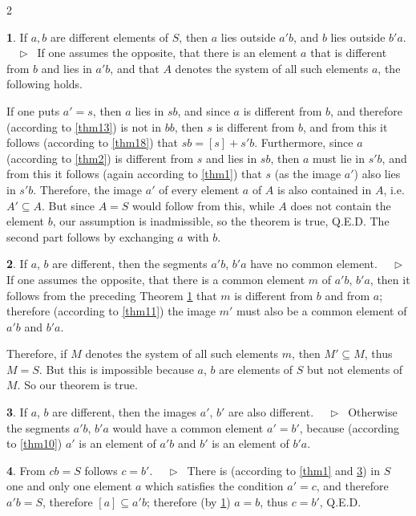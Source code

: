 \documentclass[leqno,hidelinks,10pt]{article}
\theoremstyle{definition}
\newtheorem{satz}{\protect\satzname}
\newcommand{\satzname}{}
\renewcommand{\satzname}{\hspace{-4pt}.\ Satz}%
\renewcommand{\satzname}{\hspace{-4pt}.\ Theorem}%
\newcommand\Beweis{\medskip \newline $ \phantom{'.'} \rhd \ $}%
\newcommand{\QED}{Q.E.D.}
\newcommand{\partof}{\subseteq}
\newcommand{\sref}[1]{\underline{\ref{#1}}}%
\begin{document}
\begin{paracol}{2}
\begin{rightcolumn}
\newpage

\begin{satz}\label{thm19}
If $a, b$ are different elements of $S$, then $a$ lies outside $a'b$, and $b$ lies
outside $b'a$.
\Beweis
If one assumes the opposite, that there is an element $a$ that is different from
$b$ and lies in $a'b$, and that $A$ denotes the system of all such elements $a$,
the following holds.

If one puts $a'=s$, then $a$ lies in $sb$, and since $a$ is different from $b$,
and therefore (according to \sref{thm13}) is not in $bb$, then $s$ is different
from $b$, and from this it follows (according to \sref{thm18}) that $sb = [s] + s'b$.
Furthermore, since $a$ (according to \sref{thm2}) is different from $s$ and lies
in $sb$, then $a$ must lie in $s'b$, and from this it follows (again according to
\sref{thm1}) that $s$ (as the image $a'$) also lies in $s'b$. %
Therefore, the image $a'$ of every element $a$ of $A$ is also contained in $A$,
i.e. $A' \partof A$. But since $A=S$ would follow from this, while $A$ does not
contain the element $b$, our assumption is inadmissible, so the theorem is true,
\QED
The second part follows by exchanging $a$ with $b$.%
\end{satz}

\begin{satz}\label{thm20}
If $a$, $b$ are different, then the segments $a'b$, $b'a$ have no common element.
\Beweis
If one assumes the opposite, that there is a common element $m$ of $a'b$, $b'a$,
then it follows from the preceding Theorem \sref{thm19} that $m$ is different from
$b$ and from $a$; therefore (according to \sref{thm11}) the image $m'$ must also be
a common element of $a'b$ and $b'a$.%

Therefore, if $M$ denotes the system of all such elements $m$, then $M' \partof M$,
thus $M=S$. But this is impossible because $a$, $b$ are elements of $S$ but not
elements of $M$. So our theorem is true.%
\ \\
\end{satz}

\begin{satz}\label{thm21}
If $a$, $b$ are different, then the images $a'$, $b'$ are also different.
\Beweis
Otherwise the segments $a'b$, $b'a$ would have a common element $a'=b'$, because
(according to \sref{thm10}) $a'$ is an element of $a'b$ and $b'$ is an element
of $b'a$.%
\end{satz}

\begin{satz}\label{thm22}
From $cb=S$ follows $c = b'$.
\Beweis
There is (according to \sref{thm1} and \sref{thm21}) in $S$ one and only one element
$a$ which satisfies the condition $a'=c$, and therefore $a'b = S$, therefore
$[a] \partof a'b$; therefore (by \sref{thm19}) $a=b$, thus $c=b'$, \QED%
\end{satz}


\end{rightcolumn}
\end{paracol}
\end{document}

